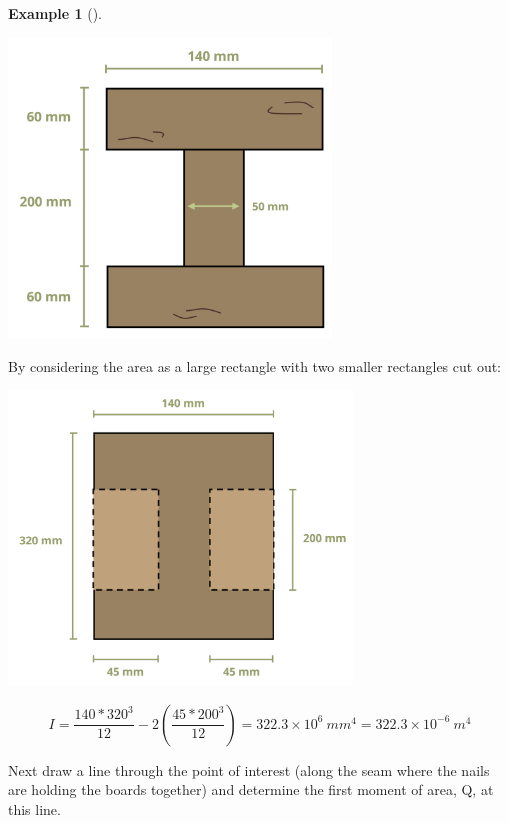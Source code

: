 \documentclass[
  letterpaper,
  DIV=11,
  numbers=noendperiod]{scrreprt}
\theoremstyle{definition}
\newtheorem{example}{Example}[chapter]
\theoremstyle{remark}
\begin{document}
\begin{tcolorbox}
\begin{example}[]
\begin{tcolorbox}
\begin{center}
\includegraphics[width=3.375in,height=\textheight]{images/CH10 PNGs/example 10.5 part 2.png}
\end{center}

By considering the area as a large rectangle with two smaller rectangles
cut out:

\begin{center}
\includegraphics[width=3.59375in,height=\textheight]{images/CH10 PNGs/example 10.5 part 3.png}
\end{center}

\[
I=\frac{140 * 320^3}{12}-2\left(\frac{45 * 200^3}{12}\right)=322.3 \times 10^6{~mm}^4=322.3 \times 10^{-6}{~m}^4
\]

Next draw a line through the point of interest (along the seam where the
nails are holding the boards together) and determine the first moment of
area, Q, at this line.


\end{tcolorbox}
\end{example}
\end{tcolorbox}
\end{document}
